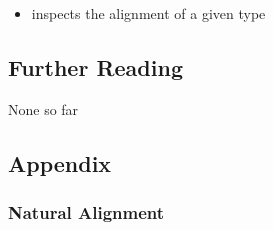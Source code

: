 \begin{itemize}
\item{%
inspects the alignment of a given type}
\end{itemize}

\subsection[Further Reading]{Further Reading}\label{further-reading}

None so far

\subsection[Appendix]{Appendix}\label{alignas-appendix}

\subsubsection[Natural Alignment]{Natural Alignment}\label{natural-alignment}

%
    
